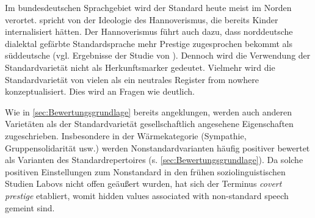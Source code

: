 Im bundesdeutschen Sprachgebiet wird der Standard heute meist im Norden verortet.
\citet[12]{Maitz.2015} spricht von der Ideologie des Hannoverismus, die bereits Kinder internalisiert h{\"a}tten.
Der Hannoverismus f{\"u}hrt auch dazu, dass norddeutsche dialektal gef{\"a}rbte Standardsprache mehr Prestige zugesprochen bekommt als s{\"u}ddeutsche (vgl. Ergebnisse der Studie von \citealp[76--77]{Hundt.1992}). 
Dennoch wird die Verwendung der Standardvarietät nicht als Herkunftsmarker gedeutet. 
Vielmehr wird die Standardvariet{\"a}t von vielen als ein neutrales Register {\glqq}from nowhere{\grqq} \citep[135]{Silverstein.2017} konzeptualisiert. 
Dies wird an Fragen wie  deutlich.

Wie in \autoref{sec:Bewertungsgrundlage} bereits angeklungen, werden auch anderen Varietäten als der Standardvarietät gesellschaftlich angesehene Eigenschaften zugeschrieben. 
Insbesondere in der Wärmekategorie (Sympathie, Gruppensolidarität usw.) werden Nonstandardvarianten häufig positiver bewertet als Varianten des Standardrepertoires (s. \autoref{sec:Bewertungsgrundlage}). %
Da solche positiven Einstellungen zum Nonstandard in den frühen soziolinguistischen Studien Labovs nicht offen geäußert wurden, hat sich der Terminus \textit{covert prestige} etabliert, womit \glqq hidden values associated with non-standard speech\grqq{} \citep[183]{Trudgill.1972} gemeint sind.
